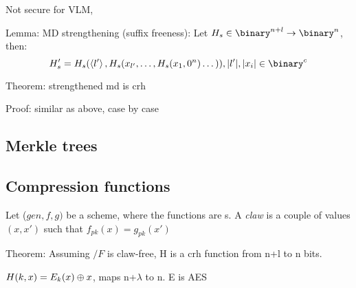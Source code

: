 Not secure for VLM, 

Lemma: MD strengthening (suffix freeness): Let $H_s \in \binary^{n + l} \to \binary^n$, then:
\[
    H'_s = H_s(\left<l'\right>, H_s(x_{l'}, \dots , H_s(x_1, 0^n) \dots)), |l'|, |x_i| \in \binary^c 
\]

Theorem: strengthened md is crh

Proof: similar as above, case by case

\subsection{Merkle trees}

\subsection{Compression functions}

Let ($gen, f, g)$ be a \pke scheme, where the functions are \prp{}s. A \emph{claw} is a couple of values $(x, x')$ such that $f_{pk}(x) = g_{pk}(x')$

Theorem: Assuming $/F$ is claw-free, H is a crh function from n+l to n bits.


$H(k, x) = E_k(x) \oplus x$, maps n+$\lambda$ to n. E is AES

